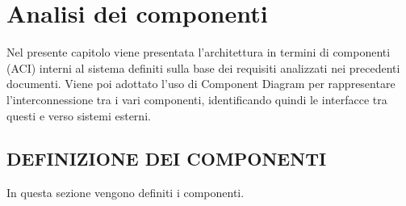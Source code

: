 \section{Analisi dei componenti}
\label{secD2:AnalisiDeiComponenti}

Nel presente capitolo viene presentata l'architettura in termini di componenti (ACI) interni al sistema definiti sulla base dei requisiti analizzati nei precedenti documenti. Viene poi adottato l'uso di Component Diagram per rappresentare l'interconnessione tra i vari componenti, identificando quindi le interfacce tra questi e verso sistemi esterni.

\subsection{DEFINIZIONE DEI COMPONENTI}
In questa sezione vengono definiti i componenti.

